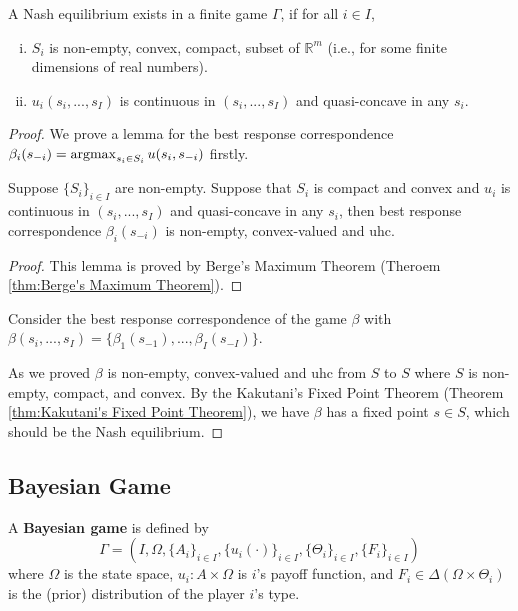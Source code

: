 \documentclass[11pt]{elegantbook_2}
\newcommand{\argmax}{\operatornamewithlimits{argmax}}
\begin{document}
\begin{theorem}
    A Nash equilibrium exists in a finite game $\Gamma$, if for all $i\in I$,
    \begin{enumerate}[(i).]
        \item $S_i$ is non-empty, convex, compact, subset of $\mathbb{R}^m$ (i.e., for some finite dimensions of real numbers).
        \item $u_i(s_i,...,s_I)$ is continuous in $(s_i,...,s_I)$ and quasi-concave in any $s_i$.
    \end{enumerate}
\end{theorem}
\begin{proof}
    We prove a lemma for the best response correspondence $\beta_i(s_{-i})=\argmax_{s_i\in S_i}u(s_i,s_{-i})$ firstly.
    \begin{lemma}
        Suppose $\{S_i\}_{i\in I}$ are non-empty. Suppose that $S_i$ is compact and convex and $u_i$ is continuous in $(s_i,...,s_I)$ and quasi-concave in any $s_i$, then best response correspondence $\beta_i(s_{-i})$ is non-empty, convex-valued and uhc.
    \end{lemma}
    \begin{proof}
        This lemma is proved by Berge's Maximum Theorem (Theroem \ref{thm:Berge's Maximum Theorem}).
    \end{proof}
    Consider the best response correspondence of the game $\beta$ with $\beta(s_i,...,s_I)=\{\beta_1(s_{-1}),...,\beta_I(s_{-I})\}$.

    As we proved $\beta$ is non-empty, convex-valued and uhc from $S$ to $S$ where $S$ is non-empty, compact, and convex. By the Kakutani's Fixed Point Theorem (Theorem \ref{thm:Kakutani's Fixed Point Theorem}), we have $\beta$ has a fixed point $s\in S$, which should be the Nash equilibrium.
\end{proof}

\subsection{Bayesian Game}
\begin{definition}
    A \textbf{Bayesian game} is defined by $$\Gamma=(I, \Omega, \{A_i\}_{i\in I}, \{u_i(\cdot)\}_{i\in I},\{\Theta_i\}_{i\in I}, \{F_i\}_{i\in I})$$
    where $\Omega$ is the state space, $u_i:A\times \Omega$ is $i$'s payoff function, and $F_i\in\Delta\left(\Omega\times\Theta_i\right)$ is the (prior) distribution of the player $i$'s type.
\end{definition}
\end{document}
